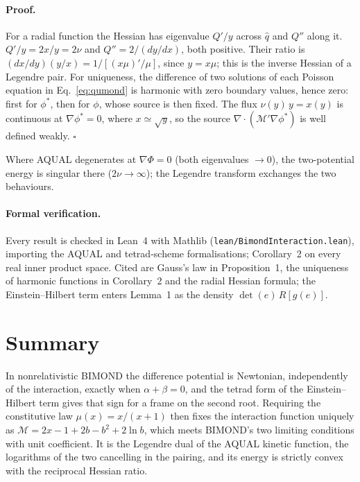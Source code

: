 \documentclass[twocolumn]{iopjournal}
\begin{document}
\paragraph{Proof.} For a radial function the Hessian has eigenvalue
$Q'/y$ across $\hat q$ and $Q''$ along it. $Q'/y = 2x/y = 2\nu$ and
$Q'' = 2/(dy/dx)$, both positive. Their ratio is
$(dx/dy)(y/x) = 1/[(x\mu)'/\mu]$, since $y = x\mu$; this is the
inverse Hessian of a Legendre pair. For uniqueness, the difference
of two solutions of each Poisson equation in Eq.~\eqref{eq:qumond}
is harmonic with zero boundary values, hence zero: first for
$\phi^*$, then for $\phi$, whose source is then fixed. The flux
$\nu(y)\,y = x(y)$ is continuous at $\nabla\phi^* = 0$, where
$x \simeq \sqrt y$, so the source $\nabla\cdot(\mathcal{M}'\nabla
\phi^*)$ is well defined weakly. \hfill $\square$

\medskip
\noindent
Where AQUAL degenerates at $\nabla\Phi = 0$ (both eigenvalues $\to 0$),
the two-potential energy is singular there ($2\nu \to \infty$); the
Legendre transform exchanges the two behaviours.

\paragraph{Formal verification.} Every result is checked in Lean~4 with
Mathlib (\texttt{lean/BimondInteraction.lean}), importing the AQUAL and
tetrad-scheme formalisations; Corollary~2 on every real inner product
space. Cited are Gauss's law in Proposition~1, the uniqueness of harmonic
functions in Corollary~2 and the radial Hessian formula; the Einstein--Hilbert
term enters Lemma~1 as the density $\det(e)\,R[g(e)]$.


\section*{Summary}

In nonrelativistic BIMOND the difference potential is Newtonian,
independently of the interaction, exactly when $\alpha + \beta = 0$,
and the tetrad form of the Einstein--Hilbert term gives that sign
for a frame on the second root. Requiring the constitutive law
$\mu(x) = x/(x+1)$ then fixes the interaction function uniquely as
$\mathcal{M} = 2x - 1 + 2b - b^2 + 2\ln b$, which meets BIMOND's
two limiting conditions with unit coefficient. It is the Legendre
dual of the AQUAL kinetic function, the logarithms of the two
cancelling in the pairing, and its energy is strictly convex with
the reciprocal Hessian ratio.
\end{document}

